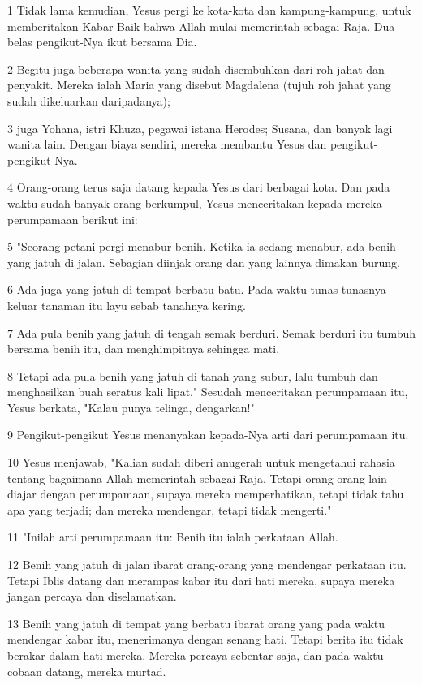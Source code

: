 \par 1 Tidak lama kemudian, Yesus pergi ke kota-kota dan kampung-kampung, untuk memberitakan Kabar Baik bahwa Allah mulai memerintah sebagai Raja. Dua belas pengikut-Nya ikut bersama Dia.
\par 2 Begitu juga beberapa wanita yang sudah disembuhkan dari roh jahat dan penyakit. Mereka ialah Maria yang disebut Magdalena (tujuh roh jahat yang sudah dikeluarkan daripadanya);
\par 3 juga Yohana, istri Khuza, pegawai istana Herodes; Susana, dan banyak lagi wanita lain. Dengan biaya sendiri, mereka membantu Yesus dan pengikut-pengikut-Nya.
\par 4 Orang-orang terus saja datang kepada Yesus dari berbagai kota. Dan pada waktu sudah banyak orang berkumpul, Yesus menceritakan kepada mereka perumpamaan berikut ini:
\par 5 "Seorang petani pergi menabur benih. Ketika ia sedang menabur, ada benih yang jatuh di jalan. Sebagian diinjak orang dan yang lainnya dimakan burung.
\par 6 Ada juga yang jatuh di tempat berbatu-batu. Pada waktu tunas-tunasnya keluar tanaman itu layu sebab tanahnya kering.
\par 7 Ada pula benih yang jatuh di tengah semak berduri. Semak berduri itu tumbuh bersama benih itu, dan menghimpitnya sehingga mati.
\par 8 Tetapi ada pula benih yang jatuh di tanah yang subur, lalu tumbuh dan menghasilkan buah seratus kali lipat." Sesudah menceritakan perumpamaan itu, Yesus berkata, "Kalau punya telinga, dengarkan!"
\par 9 Pengikut-pengikut Yesus menanyakan kepada-Nya arti dari perumpamaan itu.
\par 10 Yesus menjawab, "Kalian sudah diberi anugerah untuk mengetahui rahasia tentang bagaimana Allah memerintah sebagai Raja. Tetapi orang-orang lain diajar dengan perumpamaan, supaya mereka memperhatikan, tetapi tidak tahu apa yang terjadi; dan mereka mendengar, tetapi tidak mengerti."
\par 11 "Inilah arti perumpamaan itu: Benih itu ialah perkataan Allah.
\par 12 Benih yang jatuh di jalan ibarat orang-orang yang mendengar perkataan itu. Tetapi Iblis datang dan merampas kabar itu dari hati mereka, supaya mereka jangan percaya dan diselamatkan.
\par 13 Benih yang jatuh di tempat yang berbatu ibarat orang yang pada waktu mendengar kabar itu, menerimanya dengan senang hati. Tetapi berita itu tidak berakar dalam hati mereka. Mereka percaya sebentar saja, dan pada waktu cobaan datang, mereka murtad.
